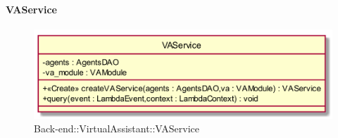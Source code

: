 \hypertarget{VAService_label}{\paragraph{VAService}}
\begin{figure}[h]
	\centering
	\includegraphics[width=\textwidth,height=\textheight,keepaspectratio]{images/ClassVAService.png}
	\caption{Back-end::VirtualAssistant::VAService}
\end{figure}
